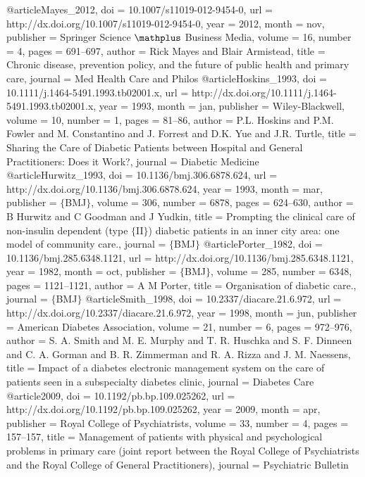 @article{Mayes_2012,
	doi = {10.1007/s11019-012-9454-0},
	url = {http://dx.doi.org/10.1007/s11019-012-9454-0},
	year = 2012,
	month = {nov},
	publisher = {Springer Science $\mathplus$ Business Media},
	volume = {16},
	number = {4},
	pages = {691--697},
	author = {Rick Mayes and Blair Armistead},
	title = {Chronic disease, prevention policy, and the future of public health and primary care},
	journal = {Med Health Care and Philos}
}
@article{Hoskins_1993,
	doi = {10.1111/j.1464-5491.1993.tb02001.x},
	url = {http://dx.doi.org/10.1111/j.1464-5491.1993.tb02001.x},
	year = 1993,
	month = {jan},
	publisher = {Wiley-Blackwell},
	volume = {10},
	number = {1},
	pages = {81--86},
	author = {P.L. Hoskins and P.M. Fowler and M. Constantino and J. Forrest and D.K. Yue and J.R. Turtle},
	title = {Sharing the Care of Diabetic Patients between Hospital and General Practitioners: Does it Work?},
	journal = {Diabetic Medicine}
}
@article{Hurwitz_1993,
	doi = {10.1136/bmj.306.6878.624},
	url = {http://dx.doi.org/10.1136/bmj.306.6878.624},
	year = 1993,
	month = {mar},
	publisher = {$\lbrace$BMJ$\rbrace$},
	volume = {306},
	number = {6878},
	pages = {624--630},
	author = {B Hurwitz and C Goodman and J Yudkin},
	title = {Prompting the clinical care of non-insulin dependent (type $\lbrace$II$\rbrace$) diabetic patients in an inner city area: one model of community care.},
	journal = {$\lbrace$BMJ$\rbrace$}
}
@article{Porter_1982,
	doi = {10.1136/bmj.285.6348.1121},
	url = {http://dx.doi.org/10.1136/bmj.285.6348.1121},
	year = 1982,
	month = {oct},
	publisher = {$\lbrace$BMJ$\rbrace$},
	volume = {285},
	number = {6348},
	pages = {1121--1121},
	author = {A M Porter},
	title = {Organisation of diabetic care.},
	journal = {$\lbrace$BMJ$\rbrace$}
}
@article{Smith_1998,
	doi = {10.2337/diacare.21.6.972},
	url = {http://dx.doi.org/10.2337/diacare.21.6.972},
	year = 1998,
	month = {jun},
	publisher = {American Diabetes Association},
	volume = {21},
	number = {6},
	pages = {972--976},
	author = {S. A. Smith and M. E. Murphy and T. R. Huschka and S. F. Dinneen and C. A. Gorman and B. R. Zimmerman and R. A. Rizza and J. M. Naessens},
	title = {Impact of a diabetes electronic management system on the care of patients seen in a subspecialty diabetes clinic},
	journal = {Diabetes Care}
}
@article{2009,
	doi = {10.1192/pb.bp.109.025262},
	url = {http://dx.doi.org/10.1192/pb.bp.109.025262},
	year = 2009,
	month = {apr},
	publisher = {Royal College of Psychiatrists},
	volume = {33},
	number = {4},
	pages = {157--157},
	title = {Management of patients with physical and psychological problems in primary care (joint report between the Royal College of Psychiatrists and the Royal College of General Practitioners)},
	journal = {Psychiatric Bulletin}
}

